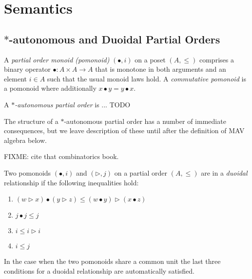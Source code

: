 \section{Semantics}\label{sec:mav-semantics}

\subsection{$*$-autonomous and Duoidal Partial Orders}

\begin{definition}
  A \emph{partial order monoid (pomonoid)} $(\bullet, i)$ on a poset
  $(A, \leq)$ comprises a binary operator $\bullet : A \times A \to A$
  that is monotone in both arguments and an element $i \in A$ such
  that the usual monoid laws hold. A \emph{commutative pomonoid} is a
  pomonoid where additionally $x \bullet y = y \bullet x$.
\end{definition}

\begin{definition}
  A \emph{$*$-autonomous partial order} is ... TODO
\end{definition}

\begin{remark}
  The structure of a $*$-autonomous partial order has a number of
  immediate consequences, but we leave description of these until
  after the definition of MAV algebra below. 
\end{remark}

FIXME: cite that combinatorics book.


\begin{definition}
  Two pomonoids $(\bullet, i)$ and $(\rhd, j)$ on a partial order
  $(A, \leq)$ are in a \emph{duoidal} relationship if the following
  inequalities hold:
  \begin{enumerate}
  \item $(w \rhd x) \bullet (y \rhd z) \leq (w \bullet y) \rhd (x \bullet z)$
  \item $j \bullet j \leq j$
  \item $i \leq i \rhd i$
  \item $i \leq j$
  \end{enumerate}
\end{definition}

\begin{remark}
  In the case when the two pomonoids share a common unit the last
  three conditions for a duoidal relationship are automatically
  satisfied.
\end{remark}

